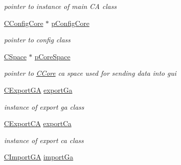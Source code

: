 \begin{DoxyCompactItemize}
\begin{DoxyCompactList}\small\item\em pointer to instance of main CA class \item\end{DoxyCompactList}\item 
\hypertarget{classCThreadCore_a8080361bc3a14e997aa26f8da2b6144a}{
\hyperlink{classCConfigCore}{CConfigCore} $\ast$ \hyperlink{classCThreadCore_a8080361bc3a14e997aa26f8da2b6144a}{pConfigCore}}
\label{classCThreadCore_a8080361bc3a14e997aa26f8da2b6144a}

\begin{DoxyCompactList}\small\item\em pointer to config class \item\end{DoxyCompactList}\item 
\hypertarget{classCThreadCore_aa6919fadf11ae4ae63f1c9d23d10f7bd}{
\hyperlink{classCSpace}{CSpace} $\ast$ \hyperlink{classCThreadCore_aa6919fadf11ae4ae63f1c9d23d10f7bd}{pCoreSpace}}
\label{classCThreadCore_aa6919fadf11ae4ae63f1c9d23d10f7bd}

\begin{DoxyCompactList}\small\item\em pointer to \hyperlink{classCCore}{CCore} ca space used for sending data into gui \item\end{DoxyCompactList}\item 
\hypertarget{classCThreadCore_a1fc888c8bd4964441440a0bca709975e}{
\hyperlink{classCExportGA}{CExportGA} \hyperlink{classCThreadCore_a1fc888c8bd4964441440a0bca709975e}{exportGa}}
\label{classCThreadCore_a1fc888c8bd4964441440a0bca709975e}

\begin{DoxyCompactList}\small\item\em instance of export ga class \item\end{DoxyCompactList}\item 
\hypertarget{classCThreadCore_a08a252657f47ad43a53af77d19969150}{
\hyperlink{classCExportCA}{CExportCA} \hyperlink{classCThreadCore_a08a252657f47ad43a53af77d19969150}{exportCa}}
\label{classCThreadCore_a08a252657f47ad43a53af77d19969150}

\begin{DoxyCompactList}\small\item\em instance of export ca class \item\end{DoxyCompactList}\item 
\hypertarget{classCThreadCore_a0611597f1c547b6ed601f7aec10446f6}{
\hyperlink{classCImportGA}{CImportGA} \hyperlink{classCThreadCore_a0611597f1c547b6ed601f7aec10446f6}{importGa}}
\label{classCThreadCore_a0611597f1c547b6ed601f7aec10446f6}


\end{DoxyCompactItemize}
